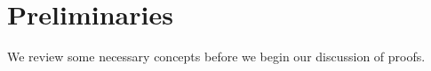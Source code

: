 \chapter{Preliminaries}
We review some necessary concepts before we begin our discussion of proofs.

